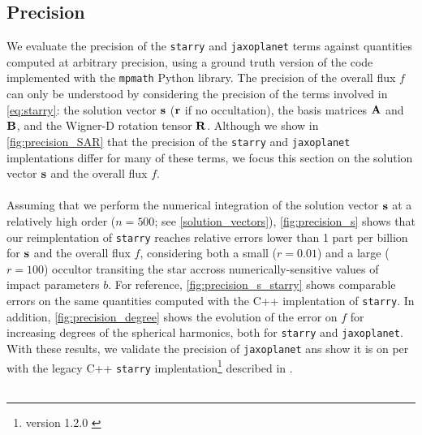 \documentclass[modern]{aastex631}
\begin{document}
\subsection{Precision}
We evaluate the precision of the \texttt{starry} and \texttt{jaxoplanet} terms against quantities computed at arbitrary precision, using a ground truth version of the code implemented with the \texttt{mpmath} Python library. The precision of the overall flux $f$ can only be understood by considering the precision of the terms involved in \autoref{eq:starry}: the solution vector ${\mathbf{s}}$ (${\mathbf{r}}$ if no occultation), the basis matrices ${\mathbf{A}}$ and ${\mathbf{B}}$, and the Wigner-D rotation tensor ${\mathbf{R}}$. Although we show in \autoref{fig:precision_SAR} that the precision of the \texttt{starry} and \texttt{jaxoplanet} implentations differ for many of these terms, we focus this section on the solution vector ${\mathbf{s}}$ and the overall flux $f$.\\\\
Assuming that we perform the numerical integration of the solution vector ${\mathbf{s}}$ at a relatively high order ($n=500$; see \autoref{solution_vectors}), \autoref{fig:precision_s} shows that our reimplentation of \texttt{starry} reaches relative errors lower than 1 part per billion for ${\mathbf{s}}$ and the overall flux $f$, considering both a small ($r=0.01$) and a large ($r=100$) occultor transiting the star accross numerically-sensitive values of impact parameters $b$. For reference, \autoref{fig:precision_s_starry} shows comparable errors on the same quantities computed with the C++ implentation of \texttt{starry}. In addition, \autoref{fig:precision_degree} shows the evolution of the error on $f$ for increasing degrees of the spherical harmonics, both for \texttt{starry} and \texttt{jaxoplanet}. With these results, we validate the precision of \texttt{jaxoplanet} ans show it is on per with the legacy C++ \texttt{starry} implentation\footnote{version 1.2.0 \citep{starry_120}} described in \cite{starry}.\\\\
\end{document}
